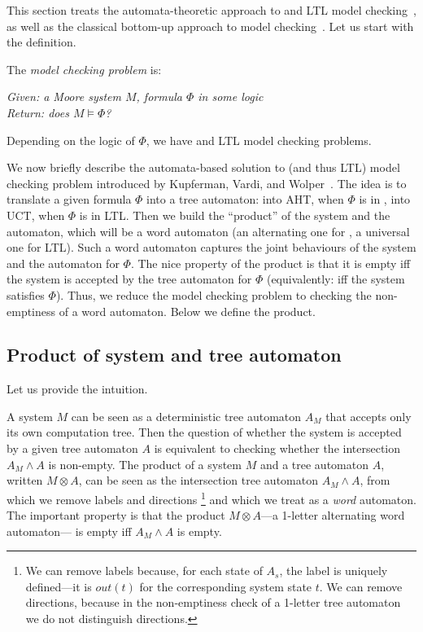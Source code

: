 This section treats the automata-theoretic approach to \CTLstar and LTL model checking~\cite{ATA},
as well as the classical bottom-up approach to \CTLstar model checking~\cite{DBLP:journals/toplas/ClarkeES86}.
Let us start with the definition.

\smallskip
The \emph{model checking problem} is:

\smallskip
\noindent
\emph{%
Given: a Moore system $M$, formula $\Phi$ in some logic\\
Return: does $M \models \Phi$?
}

\smallskip
\noindent
Depending on the logic of $\Phi$,
we have \CTLstar and LTL model checking problems.

\medskip
We now briefly describe the automata-based solution to \CTLstar (and thus LTL)
model checking problem
introduced by Kupferman, Vardi, and Wolper~\cite{ATA}.
The idea is to translate a given formula $\Phi$ into a tree automaton:
\li
\- into AHT, when $\Phi$ is in \CTLstar,
\- into UCT, when $\Phi$ is in LTL.
\il
Then we build the ``product'' of the system and the automaton,
which will be a word automaton (an alternating one for \CTLstar, a universal one for LTL).
Such a word automaton captures the joint behaviours
of the system and the automaton for $\Phi$.
The nice property of the product is that it is empty iff
the system is accepted by the tree automaton for $\Phi$
(equivalently: iff the system satisfies $\Phi$).
Thus, we reduce the model checking problem to checking the non-emptiness
of a word automaton.
Below we define the product.

\subsection*{Product of system and tree automaton}

Let us provide the intuition.

A system $M$ can be seen as a deterministic tree automaton $A_M$
that accepts only its own computation tree.
Then the question of whether the system is accepted
by a given tree automaton $A$
is equivalent to checking whether the intersection $A_M \land A$ is non-empty.
The product of a system $M$ and a tree automaton $A$,
written $M\otimes A$,
can be seen as the intersection tree automaton $A_M \land A$,
from which we remove labels and directions%
\footnote{%
 We can remove labels because,
 for each state of $A_s$,
 the label is uniquely defined---it is $out(t)$ for the corresponding system state $t$.
 We can remove directions,
 because in the non-emptiness check of a 1-letter tree automaton
 we do not distinguish directions.%
}
and which we treat as a \emph{word} automaton.
The important property is that the product $M\otimes A$---a 1-letter alternating word automaton---
is empty iff $A_M \land A$ is empty.

